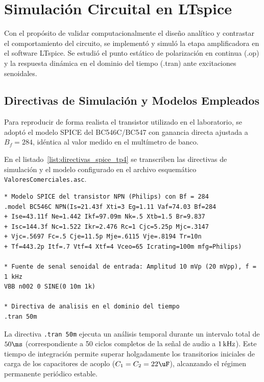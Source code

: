 \chapter{Simulación Circuital en LTspice}
\label{chap:simulacion}

Con el propósito de validar computacionalmente el diseño analítico y contrastar el comportamiento del circuito,
se implementó y simuló la etapa amplificadora en el software LTspice. Se estudió el punto estático de
polarización en continua (.op) y la respuesta dinámica en el dominio del tiempo (.tran) ante excitaciones senoidales.

\section{Directivas de Simulación y Modelos Empleados}

Para reproducir de forma realista el transistor utilizado en el laboratorio, se adoptó el modelo SPICE del BC546C/BC547
con ganancia directa ajustada a $B_f = 284$, idéntica al valor medido en el multímetro de banco.

En el listado~\ref{list:directivas_spice_tp4} se transcriben las directivas de simulación y el modelo configurado en
el archivo esquemático \texttt{ValoresComerciales.asc}.

\begin{lstlisting}[style=ltspice, caption={Directivas de simulación y modelo SPICE del transistor en LTspice.}, label={list:directivas_spice_tp4}]
* Modelo SPICE del transistor NPN (Philips) con Bf = 284
.model BC546C NPN(Is=21.43f Xti=3 Eg=1.11 Vaf=74.03 Bf=284
+ Ise=43.11f Ne=1.442 Ikf=97.09m Nk=.5 Xtb=1.5 Br=9.837
+ Isc=144.3f Nc=1.522 Ikr=2.476 Rc=1 Cjc=5.25p Mjc=.3147
+ Vjc=.5697 Fc=.5 Cje=11.5p Mje=.6115 Vje=.8194 Tr=10n
+ Tf=443.2p Itf=.7 Vtf=4 Xtf=4 Vceo=65 Icrating=100m mfg=Philips)

* Fuente de senal senoidal de entrada: Amplitud 10 mVp (20 mVpp), f = 1 kHz
VBB n002 0 SINE(0 10m 1k)

* Directiva de analisis en el dominio del tiempo
.tran 50m
\end{lstlisting}

La directiva \lstinline[style=ltspice]{.tran 50m} ejecuta un análisis temporal durante un intervalo total de $50\ms$
(correspondiente a 50 ciclos completos de la señal de audio a $1\,\mathrm{kHz}$). Este tiempo de integración permite superar
holgadamente los transitorios iniciales de carga de los capacitores de acoplo ($C_1 = C_2 = 22\uF$), alcanzando
el régimen permanente periódico estable.

